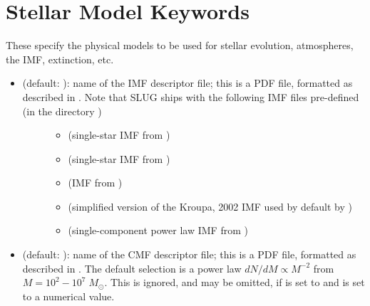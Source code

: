 \documentclass[letterpaper,10pt,english]{sphinxmanual}
\begin{document}
\section{Stellar Model Keywords}
\label{\detokenize{parameters:ssec-stellar-keywords}}\label{\detokenize{parameters:stellar-model-keywords}}
These specify the physical models to be used for stellar evolution, atmospheres, the IMF, extinction, etc.
\begin{itemize}
\item {} \begin{description}
\item[{ (default: ): name of the IMF descriptor file; this is a PDF file, formatted as described in {\hyperref[\detokenize{pdfs:sec-pdfs}]{}}. Note that SLUG ships with the following IMF files pre-defined (in the directory )}] \leavevmode\begin{itemize}
\item {} 
 (single-star IMF from )

\item {} 
 (single-star IMF from )

\item {} 
 (IMF from )

\item {} 
 (simplified version of the Kroupa, 2002 IMF used by default by )

\item {} 
 (single-component power law IMF from )

\end{itemize}

\end{description}

\item {} 
 (default: ): name of the CMF descriptor file; this is a PDF file, formatted as described in {\hyperref[\detokenize{pdfs:sec-pdfs}]{}}. The default selection is a power law \(dN/dM \propto M^{-2}\) from \(M = 10^2 - 10^7\;M_\odot\). This is ignored, and may be omitted, if  is set to  and  is set to a numerical value.


\end{itemize}
\end{document}
